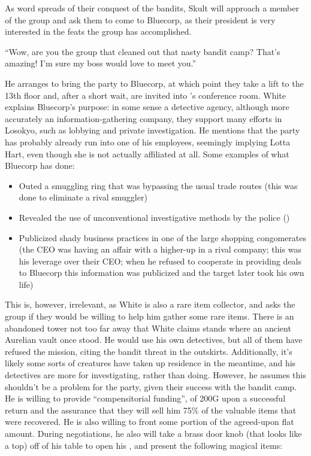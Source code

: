  As word spreads of their conquest of the bandits, Skult will approach a member of the group and ask them to come to Bluecorp, as their president is very interested in the feats the group has accomplished.\\
\begin{center}
``Wow, are you the group that cleaned out that nasty bandit camp? That's amazing! I'm sure my boss would love to meet you.''
\end{center}
He arranges to bring the party to Bluecorp, at which point they take a lift to the 13th floor and, after a short wait, are invited into 's conference room. White explains Bluecorp's purpose: in some sense a detective agency, although more accurately an information-gathering company, they support many efforts in Losokyo, such as lobbying and private investigation. He mentions that the party has probably already run into one of his employees, seemingly implying Lotta Hart, even though she is not actually affiliated at all. Some examples of what Bluecorp has done:
\begin{itemize}
\item Outed a smuggling ring that was bypassing the usual trade routes (this was done to eliminate a rival smuggler)
\item Revealed the use of unconventional investigative methods by the police ()
\item Publicized shady business practices in one of the large shopping congomerates (the CEO was having an affair with a higher-up in a rival company; this was his leverage over their CEO; when he refused to cooperate in providing deals to Bluecorp this information was publicized and the target later took his own life)
\end{itemize}
This is, however, irrelevant, as White is also a rare item collector, and asks the group if they would be willing to help him gather some rare items. There is an abandoned tower not too far away that White claims stands where an ancient Aurelian vault once stood. He would use his own detectives, but all of them have refused the mission, citing the bandit threat in the outskirts. Additionally, it's likely some sorts of creatures have taken up residence in the meantime, and his detectives are more for investigating, rather than doing. However, he assumes this shouldn't be a problem for the party, given their success with the bandit camp. He is willing to provide ``compensitorial funding'', of 200G upon a successful return and the assurance that they will sell him 75\% of the valuable items that were recovered. He is also willing to front some portion of the agreed-upon flat amount. During negotiations, he also will take a brass door knob (that looks like a top) off of his table to open his , and present the following magical items:



